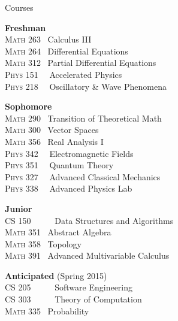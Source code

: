 \documentclass{resume} %
\begin{document}
\begin{rSection}{Courses}


\setlength{\columnsep}{1cm}
\begin{multicols}{2}

\textbf{Freshman}\\
\textsc{Math 263} 	 \	Calculus III\\
\textsc{Math 264} 	 \	Differential Equations\\
\textsc{Math 312} 	 \	Partial Differential Equations\\
\textsc{Phys 151} \  \	Accelerated Physics \\
\textsc{Phys 218} \  \	Oscillatory \& Wave Phenomena

\textbf{Sophomore}\\
\textsc{Math 290} 	 \	Transition of Theoretical Math\\
\textsc{Math 300} 	 \	Vector Spaces\\
\textsc{Math 356} 	 \	Real Analysis I\\
\textsc{Phys 342} \	 \	Electromagnetic Fields\\
\textsc{Phys 351} \	 \	Quantum Theory\\
\textsc{Phys 327} \	 \	Advanced Classical Mechanics\\
\textsc{Phys 338} \	 \	Advanced Physics Lab

\textbf{Junior}\\
\textsc{CS 150} \ \ \ \	 \	Data Structures and Algorithms\\
\textsc{Math 351} 		 \	Abstract Algebra\\
\textsc{Math 358} 		 \	Topology\\
\textsc{Math 391} 		 \	Advanced Multivariable Calculus

\textbf{Anticipated} (Spring 2015)\\
\textsc{CS 205} \ \ \ \	 \	Software Engineering\\
\textsc{CS 303} \ \ \ \	 \	Theory of Computation\\
\textsc{Math 335} 		 \	Probability


\end{multicols}

\end{rSection}








% 
% 
\end{document}
